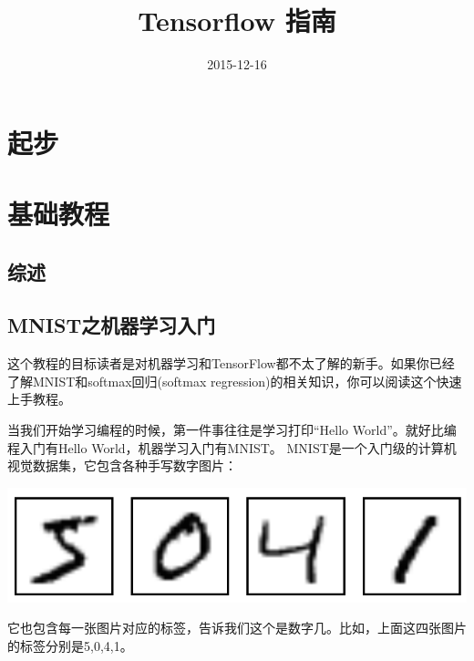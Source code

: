 \documentclass[a4paper,11pt,twoside]{ctexbook}
\title{Tensorflow 指南}
\author{}
\date{2015-12-16}
\begin{document}
\maketitle
\newpage
\tableofcontents
\newpage

\chapter{起步}

\newpage
\chapter{基础教程}

\section {综述}

\newpage
\section {MNIST之机器学习入门}\label{MINIST_beginner}


这个教程的目标读者是对机器学习和TensorFlow都不太了解的新手。如果你已经了解MNIST和softmax回归(softmax regression)的相关知识，你可以阅读这个快速上手教程。


当我们开始学习编程的时候，第一件事往往是学习打印“Hello World”。就好比编程入门有Hello World，机器学习入门有MNIST。
MNIST是一个入门级的计算机视觉数据集，它包含各种手写数字图片：
\begin{center}
\includegraphics[width=.55\textwidth]{../SOURCE/images/MNIST.png}
\end{center}
它也包含每一张图片对应的标签，告诉我们这个是数字几。比如，上面这四张图片的标签分别是5,0,4,1。
\end{document}
